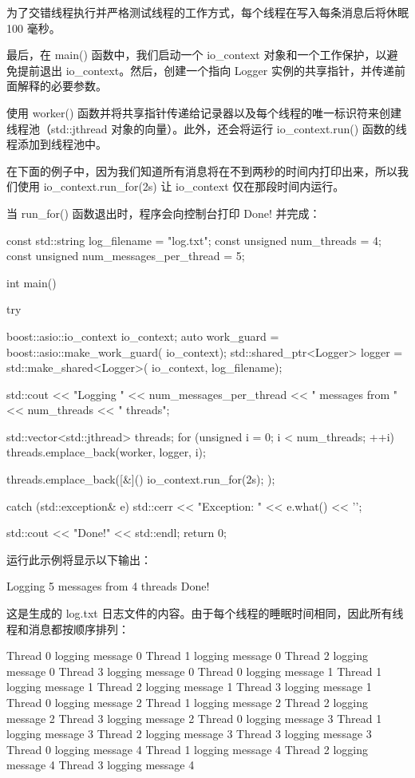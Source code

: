 为了交错线程执行并严格测试线程的工作方式，每个线程在写入每条消息后将休眠 100 毫秒。

最后，在 main() 函数中，我们启动一个 io\_context 对象和一个工作保护，以避免提前退出 io\_context。然后，创建一个指向 Logger 实例的共享指针，并传递前面解释的必要参数。

使用 worker() 函数并将共享指针传递给记录器以及每个线程的唯一标识符来创建线程池（std::jthread 对象的向量）。此外，还会将运行 io\_context.run() 函数的线程添加到线程池中。

在下面的例子中，因为我们知道所有消息将在不到两秒的时间内打印出来，所以我们使用 io\_context.run\_for(2s) 让 io\_context 仅在那段时间内运行。

当 run\_for() 函数退出时，程序会向控制台打印 Done! 并完成：

\begin{cpp}
const std::string log_filename = "log.txt";
const unsigned num_threads = 4;
const unsigned num_messages_per_thread = 5;

int main() {
    try {
        boost::asio::io_context io_context;
        auto work_guard = boost::asio::make_work_guard(
                                 io_context);
        std::shared_ptr<Logger> logger =
            std::make_shared<Logger>(
                io_context, log_filename);

        std::cout << "Logging "
                  << num_messages_per_thread
                  << " messages from " << num_threads
                  << " threads\n";

        std::vector<std::jthread> threads;
        for (unsigned i = 0; i < num_threads; ++i) {
            threads.emplace_back(worker, logger, i);
        }

        threads.emplace_back([&]() {
            io_context.run_for(2s);
        });
    } catch (std::exception& e) {
        std::cerr << "Exception: " << e.what() << '\n';
    }

    std::cout << "Done!" << std::endl;
    return 0;
}
\end{cpp}

运行此示例将显示以下输出：

\begin{shell}
Logging 5 messages from 4 threads
Done!
\end{shell}

这是生成的 log.txt 日志文件的内容。由于每个线程的睡眠时间相同，因此所有线程和消息都按顺序排列：

\begin{shell}
Thread 0 logging message 0
Thread 1 logging message 0
Thread 2 logging message 0
Thread 3 logging message 0
Thread 0 logging message 1
Thread 1 logging message 1
Thread 2 logging message 1
Thread 3 logging message 1
Thread 0 logging message 2
Thread 1 logging message 2
Thread 2 logging message 2
Thread 3 logging message 2
Thread 0 logging message 3
Thread 1 logging message 3
Thread 2 logging message 3
Thread 3 logging message 3
Thread 0 logging message 4
Thread 1 logging message 4
Thread 2 logging message 4
Thread 3 logging message 4
\end{shell}

